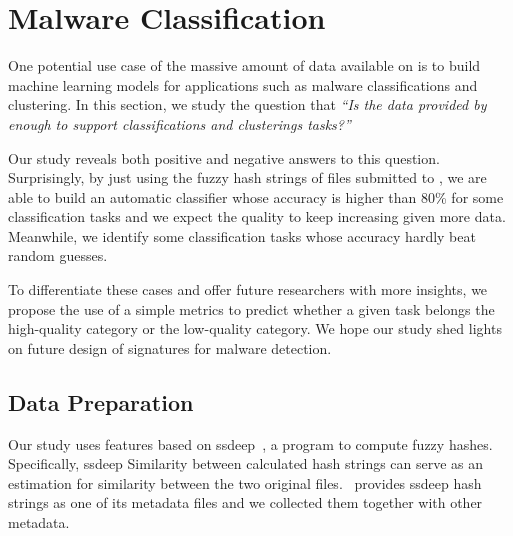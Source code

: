 \section{Malware Classification}
\label{sec:ssdeep}

One potential use case of the massive amount of data 
available on \vt{} is to build 
machine learning models for applications
such as malware classifications and
clustering. In this section, we study
the question that {\em ``Is the data
provided by \vt{} enough to support
classifications and clusterings tasks?''}

Our study reveals both positive and
negative answers to this question.
Surprisingly, by just using the fuzzy hash strings of files submitted to \vt{},
we are able to build an automatic classifier whose
accuracy is higher than 80\% for some classification tasks
and we expect the quality to keep increasing
given more data.
Meanwhile, we identify some classification tasks
whose accuracy hardly beat random guesses.

To differentiate these cases and offer future researchers with more insights, 
we propose the use of a simple metrics to predict whether a given task belongs
the high-quality category or the low-quality
category. We hope our study shed lights
on future design of signatures for malware
detection.



\subsection{Data Preparation}



Our study uses features based on ssdeep~\cite{ssdeep}, a program to compute fuzzy hashes. 
Specifically, ssdeep 
Similarity between calculated hash strings can serve as an estimation for similarity between the two original files. 
\vt\ provides ssdeep hash strings as one of its metadata files and we collected them together with other metadata.


